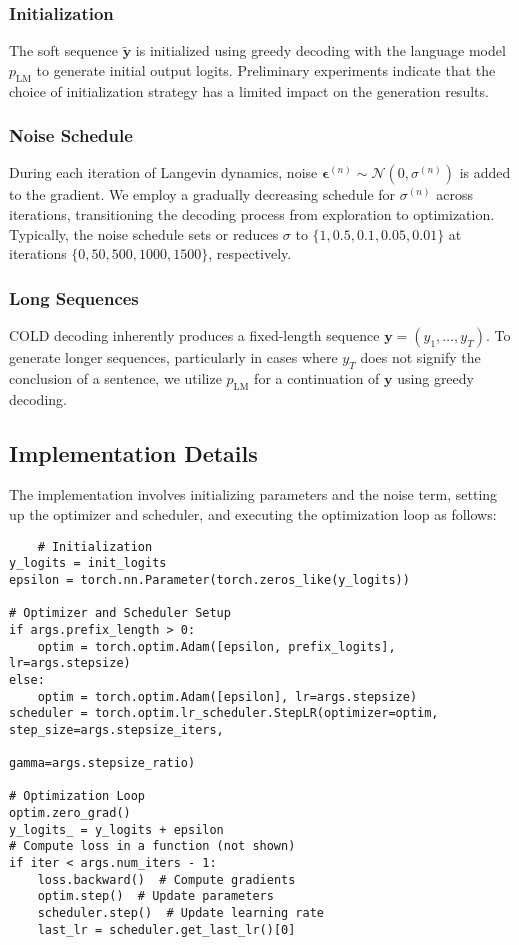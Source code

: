 \documentclass{article}
\begin{document}
\subsubsection*{Initialization}
The soft sequence \(\mathbf{\tilde{y}}\) is initialized using greedy decoding with the language model \(p_{\text{LM}}\) to generate initial output logits. Preliminary experiments indicate that the choice of initialization strategy has a limited impact on the generation results.

\subsubsection*{Noise Schedule}
During each iteration of Langevin dynamics, noise \(\boldsymbol{\epsilon}^{(n)} \sim \mathcal{N}(0, \sigma^{(n)})\) is added to the gradient. We employ a gradually decreasing schedule for \(\sigma^{(n)}\) across iterations, transitioning the decoding process from exploration to optimization. Typically, the noise schedule sets or reduces \(\sigma\) to \(\{1, 0.5, 0.1, 0.05, 0.01\}\) at iterations \(\{0, 50, 500, 1000, 1500\}\), respectively.

\subsubsection*{Long Sequences}
COLD decoding inherently produces a fixed-length sequence \(\mathbf{y} = (y_1, \ldots, y_T)\). To generate longer sequences, particularly in cases where \(y_T\) does not signify the conclusion of a sentence, we utilize \(p_{\text{LM}}\) for a continuation of \(\mathbf{y}\) using greedy decoding.

\subsection{Implementation Details}

The implementation involves initializing parameters and the noise term, setting up the optimizer and scheduler, and executing the optimization loop as follows:

\begin{verbatim}
    # Initialization
y_logits = init_logits
epsilon = torch.nn.Parameter(torch.zeros_like(y_logits))

# Optimizer and Scheduler Setup
if args.prefix_length > 0:
    optim = torch.optim.Adam([epsilon, prefix_logits], lr=args.stepsize)
else:
    optim = torch.optim.Adam([epsilon], lr=args.stepsize)
scheduler = torch.optim.lr_scheduler.StepLR(optimizer=optim, step_size=args.stepsize_iters,
                                             gamma=args.stepsize_ratio)

# Optimization Loop
optim.zero_grad()
y_logits_ = y_logits + epsilon
# Compute loss in a function (not shown)
if iter < args.num_iters - 1:
    loss.backward()  # Compute gradients
    optim.step()  # Update parameters
    scheduler.step()  # Update learning rate
    last_lr = scheduler.get_last_lr()[0]
\end{verbatim}
\end{document}
